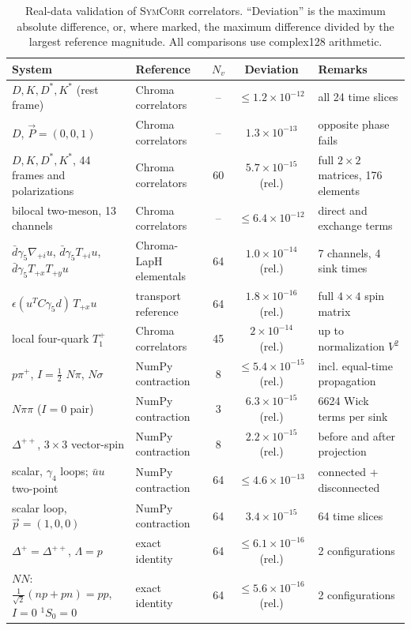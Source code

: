 \documentclass[a4paper,fleqn]{cas-dc}
\newcommand{\add}[1]{{\color{blue}#1}}
\begin{document}
\begin{table}[t]
\centering
\caption{Real-data validation of \textsc{SymCorr} correlators. ``Deviation'' is the
maximum absolute difference, or, where marked, the maximum difference divided by
the largest reference magnitude. All comparisons use complex128 arithmetic.}
\label{tab:validation}
\footnotesize
\setlength{\tabcolsep}{4pt}
\begin{tabular}{@{}llccl@{}}
\toprule
System & Reference & \(N_v\) & Deviation & Remarks \\
\midrule
\(D, K, D^*, K^*\) (rest frame) & Chroma correlators & -- & \(\le 1.2\times10^{-12}\) & all 24 time slices \\
\(D\), \(\vec P=(0,0,1)\) & Chroma correlators & -- & \(1.3\times10^{-13}\) & opposite phase fails \\
\add{\(D, K, D^*, K^*\), 44 frames and polarizations} & \add{Chroma correlators} & \add{60} & \add{\(5.7\times10^{-15}\) (rel.)} & \add{full \(2\times2\) matrices, 176 elements} \\
bilocal two-meson, 13 channels & Chroma correlators & -- & \(\le 6.4\times10^{-12}\) & direct and exchange terms \\
\(\bar d\gamma_5 \nabla_{+i} u\), \(\bar d\gamma_5 T_{+i}u\), \(\bar d\gamma_5 T_{+x}T_{+y}u\) & Chroma-LapH elementals & 64 & \(1.0\times10^{-14}\) (rel.) & 7 channels, 4 sink times \\
\(\epsilon(u^T C\gamma_5 d)\,T_{+x}u\) & transport reference & 64 & \(1.8\times10^{-16}\) (rel.) & full \(4\times4\) spin matrix \\
local four-quark \(T_1^{+}\) & Chroma correlators & 45 & \(2\times10^{-14}\) (rel.) & up to normalization \(V^2\) \\
\(p\pi^+\), \(I=\tfrac12\) \(N\pi\), \(N\sigma\) & NumPy contraction & 8 & \(\le 5.4\times10^{-15}\) (rel.) & incl. equal-time propagation \\
\(N\pi\pi\) (\(I=0\) pair) & NumPy contraction & 3 & \(6.3\times10^{-15}\) (rel.) & 6624 Wick terms per sink \\
\(\Delta^{++}\), \(3\times3\) vector-spin & NumPy contraction & 8 & \(2.2\times10^{-15}\) (rel.) & before and after projection \\
scalar, \(\gamma_4\) loops; \(\bar uu\) two-point & NumPy contraction & 64 & \(\le 4.6\times10^{-13}\) & connected + disconnected \\
scalar loop, \(\vec p=(1,0,0)\) & NumPy contraction & 64 & \(3.4\times10^{-15}\) & 64 time slices \\
\(\Delta^+ = \Delta^{++}\), \(\Lambda = p\) & exact identity & 64 & \(\le 6.1\times10^{-16}\) (rel.) & 2 configurations \\
\(NN\): \(\tfrac{1}{\sqrt2}(np+pn) = pp\), \(I=0\) \(^1S_0 = 0\) & exact identity & 64 & \(\le 5.6\times10^{-16}\) (rel.) & 2 configurations \\
\bottomrule
\end{tabular}
\end{table}
\end{document}
